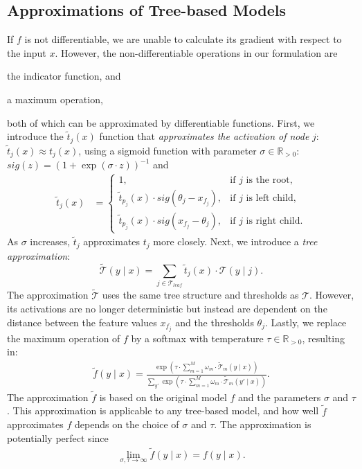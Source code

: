 \subsection{Approximations of Tree-based Models}
If $f$ is not differentiable, we are unable to calculate its gradient with respect to the input $x$. 
However, the non-differentiable operations in our formulation are 
\begin{enumerate*}[label=(\roman*)]
	\item the indicator function, and
	\item a maximum operation, 
\end{enumerate*}
both of which can be approximated by differentiable functions.
First, we introduce the $\widetilde{t}_j(x)$ function that \emph{approximates the activation of node} $j$: $\widetilde{t}_j(x) \approx t_j(x)$, using a sigmoid function with parameter $\sigma \in \mathbb{R}_{>0}$:
$
\textit{sig}(z) = (1 + \exp(\sigma \cdot z))^{-1}
$
and
\begin{align}
\widetilde{t}_j(x) &{} =
    \begin{cases}
    1, & \text{if $j$ is the root}, \\
   \widetilde{t}_{p_j}(x) \cdot \textit{sig}(\theta_j {-} x_{f_j}), & \text{if $j$ is left child}, \\
   \widetilde{t}_{p_j}(x) \cdot  \textit{sig}( x_{f_j} {-} \theta_j), & \text{if $j$ is right child}.
    \end{cases}
\label{eq:sigma}    
\end{align}
As $\sigma$ increases, $\widetilde{t}_j$ approximates $t_j$ more closely.
Next, we introduce a \emph{tree approximation}:
\begin{equation}
\widetilde{\mathcal{T}}(y \mid x) = \sum_{j \in \mathcal{T}_\mathit{leaf}}  \widetilde{t}_j(x) \cdot \mathcal{T}(y \mid j).
\end{equation}
The approximation $\widetilde{\mathcal{T}}$ uses the same tree structure and thresholds as $\mathcal{T}$.
However, its activations are no longer deterministic but instead are dependent on the distance between the feature values $x_{f_j}$ and the thresholds $\theta_j$.
Lastly, we replace the maximum operation of $f$ by a softmax with temperature $\tau\in\mathbb{R}_{>0}$, resulting in:
\begin{align}
\tilde{f}(y \mid x)
= \frac{
\exp\left(\tau \cdot \sum_{m=1}^M \omega_m \cdot \widetilde{\mathcal{T}}_m(y \mid x)\right)
}{
\sum_{y'} \exp\left(\tau \cdot \sum_{m=1}^M \omega_m \cdot \widetilde{\mathcal{T}}_m(y' \mid x)\right)
}.
\label{eq:tau}
\end{align}
The approximation $\tilde{f}$ is based on the original model $f$ and the parameters $\sigma$ and $\tau$.
This approximation is applicable to any tree-based model, and 
how well $\tilde{f}$ approximates $f$ depends on the choice of $\sigma$ and $\tau$.
The approximation is potentially perfect since
\begin{align}
\lim_{\sigma,\tau\rightarrow\infty}
\tilde{f}(y \mid x) = f(y \mid x).
\end{align}
%
